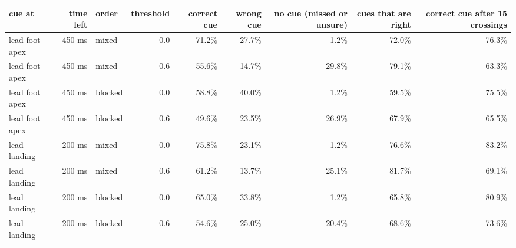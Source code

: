 \begin{adjustbox}{max width=\textwidth}
{\scriptsize
\begin{tabular}{lrlrrrrrr}
\toprule
\textbf{cue at} & \textbf{time left} & \textbf{order} & \textbf{threshold} & \textbf{correct cue} & \textbf{wrong cue} & \textbf{no cue (missed or unsure)} & \textbf{cues that are right} & \textbf{correct cue after 15 crossings} \\
\midrule
lead foot apex & 450 ms & mixed & 0.0 & 71.2\% & 27.7\% & 1.2\% & 72.0\% & 76.3\% \\
lead foot apex & 450 ms & mixed & 0.6 & 55.6\% & 14.7\% & 29.8\% & 79.1\% & 63.3\% \\
lead foot apex & 450 ms & blocked & 0.0 & 58.8\% & 40.0\% & 1.2\% & 59.5\% & 75.5\% \\
lead foot apex & 450 ms & blocked & 0.6 & 49.6\% & 23.5\% & 26.9\% & 67.9\% & 65.5\% \\
lead landing & 200 ms & mixed & 0.0 & 75.8\% & 23.1\% & 1.2\% & 76.6\% & 83.2\% \\
lead landing & 200 ms & mixed & 0.6 & 61.2\% & 13.7\% & 25.1\% & 81.7\% & 69.1\% \\
lead landing & 200 ms & blocked & 0.0 & 65.0\% & 33.8\% & 1.2\% & 65.8\% & 80.9\% \\
lead landing & 200 ms & blocked & 0.6 & 54.6\% & 25.0\% & 20.4\% & 68.6\% & 73.6\% \\
\bottomrule
\end{tabular}
}
\end{adjustbox}
